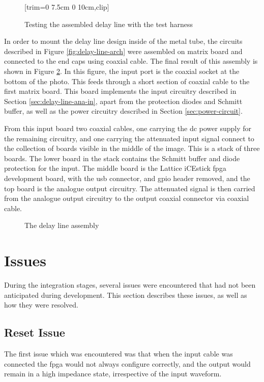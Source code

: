 \begin{figure}[ht]
	\centering
	[trim={0 7.5cm 0 10cm},clip] %
	\caption{Testing the assembled delay line with the test harness}
	\label{fig:delay-line-testing}
\end{figure}

In order to mount the delay line design inside of the metal tube, the circuits described in Figure \ref{fig:delay-line-arch} were assembled on matrix board and connected to the end caps using coaxial cable. The final result of this assembly is shown in Figure \ref{fig:delay-line-assy}. In this figure, the input port is the coaxial socket at the bottom of the photo. This feeds through a short section of coaxial cable to the first matrix board. This board implements the input circuitry described in Section \ref{sec:delay-line-ana-in}, apart from the protection diodes and Schmitt buffer, as well as the power circuitry described in Section \ref{sec:power-circuit}.

From this input board two coaxial cables, one carrying the \gls{dc} power supply for the remaining circuitry, and one carrying the attenuated input signal connect to the collection of boards visible in the middle of the image. This is a stack of three boards. The lower board in the stack contains the Schmitt buffer and diode protection for the input. The middle board is the Lattice iCEstick \gls{fpga} development board, with the \gls{usb} connector, and \gls{gpio} header removed, and the top board is the analogue output circuitry. The attenuated signal is then carried from the analogue output circuitry to the output coaxial connector via coaxial cable.

\begin{figure}[ht]
	\centering
	\caption{The delay line assembly}
	\label{fig:delay-line-assy}
\end{figure}



\section{Issues}

During the integration stages, several issues were encountered that had not been anticipated during development. This section describes these issues, as well as how they were resolved.

\subsection{ Reset Issue}
The first issue which was encountered was that when the input cable was connected the \gls{fpga} would not always configure correctly, and the output would remain in a high impedance state, irrespective of the input waveform.

